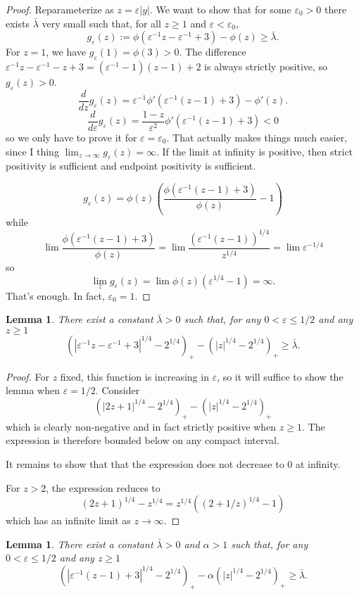 \documentclass[11pt]{amsart}
\newtheorem{lemma}[theorem]{Lemma}
\theoremstyle{remark}
\newcommand{\eps}{\varepsilon}
\newcommand{\paren}[1]{\left( #1 \right)}
\newcommand{\n}{^{-1}}
\begin{document}
\begin{proof}
Reparameterize as $z = \eps |y|$.  We want to show that for some $\eps_0 > 0$ there exists $\bar{\lambda}$ very small such that, for all $z \geq 1$ and $\eps < \eps_0$,
\[ g_\eps(z) := \phi(\eps\n z - \eps\n + 3) - \phi(z) \geq \bar{\lambda}. \]
For $z = 1$, we have $g_\eps(1) = \phi(3) > 0$.  The difference $\eps\n z - \eps\n - z + 3 = (\eps\n-1) (z-1) + 2$ is always strictly positive, so $g_\eps(z) > 0$.  
\[ \frac{d}{dz} g_\eps(z) = \eps\n \phi'(\eps\n(z-1)+3) - \phi'(z). \]
\[ \frac{d}{d\eps} g_\eps(z) = \frac{1-z}{\eps^2} \phi'(\eps\n(z-1)+3) < 0 \]
so we only have to prove it for $\eps = \eps_0$.  That actually makes things much easier, since I thing $\lim_{z \to \infty} g_\eps(z) = \infty$.  If the limit at infinity is positive, then strict positivity is sufficient and endpoint positivity is sufficient. 

\[ g_\eps(z) = \phi(z) \paren{ \frac{\phi(\eps\n(z-1) + 3)}{\phi(z)} - 1} \]
while
\[ \lim \frac{\phi(\eps\n(z-1) + 3)}{\phi(z)} = \lim \frac{(\eps\n (z-1))^{1/4}}{z^{1/4}} = \lim \eps^{-1/4} \]
so
\[ \lim_z g_\eps(z) = \lim \phi(z) (\eps^{1/4} - 1) = \infty. \]
That's enough.  In fact, $\eps_0 = 1$.  
\end{proof}

\begin{lemma}
There exist a constant $\bar{\lambda} > 0$ such that, for any $0 < \eps \leq 1/2$ and any $z \geq 1$
\[ \paren{|\eps\n z - \eps\n + 3|^{1/4} - 2^{1/4}}_+ - \paren{|z|^{1/4} - 2^{1/4}}_+ \geq \bar{\lambda}. \]
\end{lemma}

\begin{proof}
For $z$ fixed, this function is increasing in $\eps$, so it will suffice to show the lemma when $\eps = 1/2$.  Consider
\[ \paren{|2 z + 1|^{1/4} - 2^{1/4}}_+ - \paren{|z|^{1/4} - 2^{1/4}}_+ \]
which is clearly non-negative and in fact strictly positive when $z \geq 1$.  The expression is therefore bounded below on any compact interval.  

It remains to show that that the expression does not decrease to 0 at infinity.  

For $z > 2$, the expression reduces to
\[ (2z+1)^{1/4} - z^{1/4} = z^{1/4} \paren{(2 + 1/z)^{1/4} - 1} \]
which has an infinite limit as $z \to \infty$.  
\end{proof}

\begin{lemma}
There exist a constant $\bar{\lambda} > 0$ and $\alpha > 1$ such that, for any $0 < \eps \leq 1/2$ and any $z \geq 1$
\[ \paren{|\eps\n (z - 1) + 3|^{1/4} - 2^{1/4}}_+ - \alpha \paren{|z|^{1/4} - 2^{1/4}}_+ \geq \bar{\lambda}. \]
\end{lemma}
\end{document}
